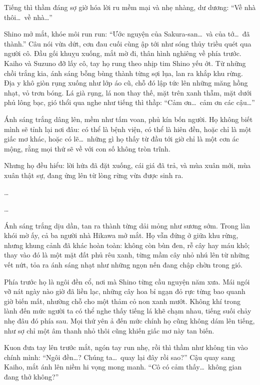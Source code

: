 \documentclass[../main.tex]{subfiles}
\begin{document}
Tiếng thì thầm đáng sợ giờ hóa lời ru mềm mại và nhẹ nhàng, dư dương: ``Về nhà thôi\dots\ về nhà\dots''

Shino mở mắt, khóe môi run run: ``Ước nguyện của Sakura-san\dots\ và của tớ\dots\ đã thành.'' Câu nói vừa dứt, cơn đau cuối cùng ập tới như sóng thủy triều quét qua người cô. Đầu gối khuỵu xuống, mắt mờ đi, thân hình nghiêng về phía trước. Kaiho và Suzuno đỡ lấy cô, tay họ rung theo nhịp tim Shino yếu ớt. Từ những chồi trắng kia, ánh sáng bỗng bùng thành từng sợi lụa, lan ra khắp khu rừng. Địa y khô giòn rụng xuống như lớp áo cũ, chỗ đó lập tức lên những măng hồng nhạt, vỏ trơn bóng. Lá già rụng, lá non thay thế, mặt trên xanh thẫm, mặt dưới phủ lông bạc, gió thổi qua nghe như tiếng thì thầp: ``Cảm ơn\dots\ cảm ơn các cậu\dots''

Ánh sáng trắng dâng lên, mềm như tấm voan, phủ kín bốn người. Họ không biết mình sẽ tỉnh lại nơi đâu: có thể là bệnh viện, có thể là hiên đền, hoặc chỉ là một giấc mơ khác, hoặc có lẽ\dots\ những gì họ thấy từ đầu tới giờ chỉ là một cơn ác mộng, rằng mọi thứ sẽ về với con số không tròn trĩnh.

Nhưng họ đều hiểu: lời hứa đã đặt xuống, cái giá đã trả, và mùa xuân mới, mùa xuân thật sự, đang ửng lên từ lòng rừng vừa được sinh ra.

\dots

\dots

\ct

Ánh sáng trắng dịu dần, tan ra thành từng dải mỏng như sương sớm. Trong làn khói mờ ấy, cả ba người nhà Hikawa mở mắt. Họ vẫn đứng ở giữa khu rừng, nhưng khung cảnh đã khác hoàn toàn: không còn bùn đen, rễ cây hay máu khô; thay vào đó là một mặt đất phủ rêu xanh, từng mầm cây nhỏ nhú lên từ những vết nứt, tỏa ra ánh sáng nhạt như những ngọn nến đang chập chờn trong gió.

Phía trước họ là ngôi đền cổ, nơi mà Shino từng cầu nguyện năm xưa. Mái ngói vỡ nát ngày nào giờ đã liền lạc, những cây hoa bỉ ngạn đỏ rực từng bao quanh giờ biến mất, nhường chỗ cho một thảm cỏ non xanh mướt. Không khí trong lành đến mức người ta có thể nghe thấy tiếng lá khẽ chạm nhau, tiếng suối chảy nhẹ đâu đó phía sau. Mọi thứ yên ả đến mức chính họ cũng không dám lên tiếng, như sợ chỉ một âm thanh nhỏ thôi cũng khiến giấc mơ này tan biến.

Kuon đưa tay lên trước mắt, ngón tay run nhẹ, rồi thì thầm như không tin vào chính mình: ``Ngôi đền\dots? Chúng ta\dots\ quay lại đây rồi sao?'' Cậu quay sang Kaiho, mắt ánh lên niềm hi vọng mong manh. ``Cô có cảm thấy\dots\ không gian đang thở không?''
\end{document}
